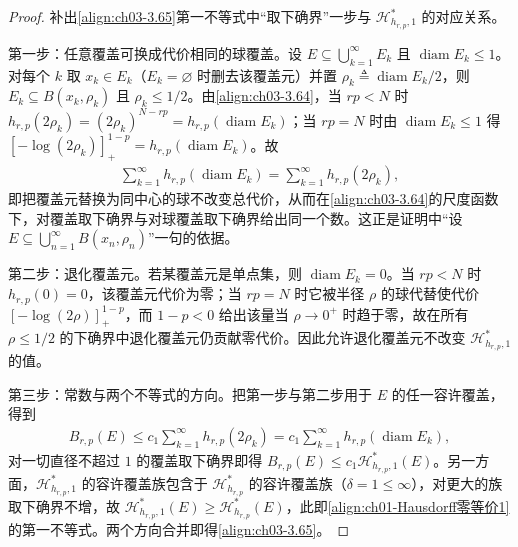 \documentclass[../../main.tex]{subfiles}%
\begin{document}
\begin{proof}
补出\eqref{align:ch03-3.65}第一不等式中“取下确界”一步与 $\mathcal{H}^*_{h_{r,p},1}$ 的对应关系。

第一步：任意覆盖可换成代价相同的球覆盖。设 $E\subseteq\bigcup_{k=1}^\infty E_k$ 且 $\operatorname{diam}E_k\leqslant1$。对每个 $k$ 取 $x_k\in E_k$（$E_k=\varnothing$ 时删去该覆盖元）并置 $\rho_k\triangleq\operatorname{diam}E_k/2$，则 $E_k\subseteq B(x_k,\rho_k)$ 且 $\rho_k\leqslant1/2$。由\eqref{align:ch03-3.64}，当 $rp<N$ 时 $h_{r,p}(2\rho_k)=(2\rho_k)^{N-rp}=h_{r,p}(\operatorname{diam}E_k)$；当 $rp=N$ 时由 $\operatorname{diam}E_k\leqslant1$ 得 $[-\log(2\rho_k)]_+^{1-p}=h_{r,p}(\operatorname{diam}E_k)$。故
\begin{align*}
\sum_{k=1}^\infty h_{r,p}(\operatorname{diam}E_k)=\sum_{k=1}^\infty h_{r,p}(2\rho_k),
\end{align*}
即把覆盖元替换为同中心的球不改变总代价，从而在\eqref{align:ch03-3.64}的尺度函数下，对覆盖取下确界与对球覆盖取下确界给出同一个数。这正是证明中“设 $E\subseteq\bigcup_{n=1}^\infty B(x_n,\rho_n)$”一句的依据。

第二步：退化覆盖元。若某覆盖元是单点集，则 $\operatorname{diam}E_k=0$。当 $rp<N$ 时 $h_{r,p}(0)=0$，该覆盖元代价为零；当 $rp=N$ 时它被半径 $\rho$ 的球代替使代价 $[-\log(2\rho)]_+^{1-p}$，而 $1-p<0$ 给出该量当 $\rho\to0^+$ 时趋于零，故在所有 $\rho\leqslant1/2$ 的下确界中退化覆盖元仍贡献零代价。因此允许退化覆盖元不改变 $\mathcal{H}^*_{h_{r,p},1}$ 的值。

第三步：常数与两个不等式的方向。把第一步与第二步用于 $E$ 的任一容许覆盖，得到
\begin{align*}
B_{r,p}(E)\leqslant c_1\sum_{k=1}^\infty h_{r,p}(2\rho_k)=c_1\sum_{k=1}^\infty h_{r,p}(\operatorname{diam}E_k),
\end{align*}
对一切直径不超过 $1$ 的覆盖取下确界即得 $B_{r,p}(E)\leqslant c_1\mathcal{H}^*_{h_{r,p},1}(E)$。另一方面，$\mathcal{H}^*_{h_{r,p},1}$ 的容许覆盖族包含于 $\mathcal{H}^*_{h_{r,p}}$ 的容许覆盖族（$\delta=1\leqslant\infty$），对更大的族取下确界不增，故 $\mathcal{H}^*_{h_{r,p},1}(E)\geqslant\mathcal{H}^*_{h_{r,p}}(E)$，此即\eqref{align:ch01-Hausdorff零等价1}的第一不等式。两个方向合并即得\eqref{align:ch03-3.65}。
\end{proof}
\end{document}
